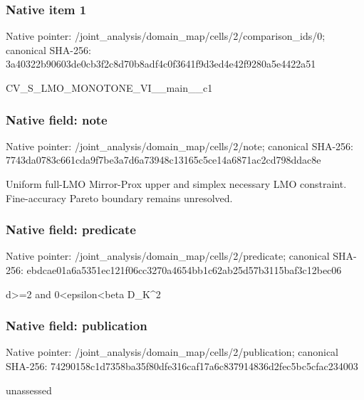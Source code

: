 \documentclass[10pt,a4paper]{article}
\begin{document}
\subsubsection{Native item 1}
Native pointer: /joint\_\allowbreak{}analysis/domain\_\allowbreak{}map/cells/2/comparison\_\allowbreak{}ids/0; canonical SHA-256: 3a40322b90603de0cb3f2c8d70b8adf4c0f3641f9d3ed4e42f9280a5e4422a51

\begingroup\raggedright\sloppy CV\_\allowbreak{}S\_\allowbreak{}LMO\_\allowbreak{}MONOTONE\_\allowbreak{}VI\_\allowbreak{}\_\allowbreak{}main\_\allowbreak{}\_\allowbreak{}c1\par\endgroup

\subsubsection{Native field: note}
Native pointer: /joint\_\allowbreak{}analysis/domain\_\allowbreak{}map/cells/2/note; canonical SHA-256: 7743da0783c661cda9f7be3a7d6a73948c13165c5ce14a6871ac2cd798ddac8e

\begingroup\raggedright\sloppy Uniform full-LMO Mirror-Prox upper and simplex necessary LMO constraint. Fine-accuracy Pareto boundary remains unresolved.\par\endgroup

\subsubsection{Native field: predicate}
Native pointer: /joint\_\allowbreak{}analysis/domain\_\allowbreak{}map/cells/2/predicate; canonical SHA-256: ebdcae01a6a5351ec121f06cc3270a4654bb1c62ab25d57b3115baf3c12bec06

\begingroup\raggedright\sloppy d>=\allowbreak{}2 and 0<epsilon<beta D\_\allowbreak{}K\textasciicircum{}2\par\endgroup

\subsubsection{Native field: publication}
Native pointer: /joint\_\allowbreak{}analysis/domain\_\allowbreak{}map/cells/2/publication; canonical SHA-256: 74290158c1d7358ba35f80dfe316caf17a6c837914836d2fec5bc5cfac234003

\begingroup\raggedright\sloppy unassessed\par\endgroup
\end{document}
